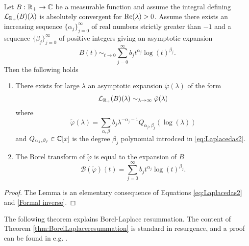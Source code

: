 \begin{lemma}  \label{lem:masterlemma}
Let $B: \mathbb{R}_+ \rightarrow \mathbb{C}$ be a measurable function and assume the integral defining $\mathcal{L}_{\mathbb{R}_+}(B)(\lambda)$ is absolutely convergent for $\operatorname{Re}(\lambda)>0$. Assume there exists an increasing sequence $\{\alpha_j\}_{j=0}^{\infty}$ of real numbers strictly greater than $-1$ and a sequence $\{\beta_j \}_{j=0}^{\infty}$ of positive integers  giving an asymptotic expansion 
\begin{equation} \label{eq:tnearzero} B(t) \sim_{t \rightarrow 0} \sum_{j=0}^{\infty} b_{j} t^{\alpha_j} \log(t)^{\beta_j}.\end{equation}
Then the following holds  \begin{enumerate} \item There exists for large $ \lambda $ an asymptotic expansion $\tilde{\varphi}(\lambda)$ of the form
	\begin{equation}
	\mathcal{L}_{\mathbb{R}_+}(B) (\lambda) \sim_{\lambda \rightarrow \infty} \tilde{\varphi}(\lambda)
	\end{equation} 
	where
	\begin{equation} \label{eq:BorelA}
	\tilde{\varphi}(\lambda)  = \sum_{\alpha, \beta} b_{j} \lambda^{-\alpha_j-1}Q_{\alpha_j,\beta_j}(\log(\lambda))
	\end{equation} 
	and $Q_{\alpha_j,\beta_j} \in \mathbb{C}[x]$ is the degree $\beta_j$ polynomial introdced in \eqref{eq:Laplacedas2}.
	\item The Borel transform of $\tilde{\varphi}$ is equal to the expansion of $B$ 
	\begin{equation} \label{eq:BorelB}
	\mathcal{B}(\tilde{\varphi})(t)=  \sum_{j=0}^{\infty} b_{j} t^{\alpha_j} \log(t)^{\beta_j}.
	\end{equation}  \end{enumerate}
\end{lemma}

\begin{proof} The Lemma is an elementary consequence of Equations \eqref{eq:Laplacedas2} and  \eqref{Formal inverse}.   \end{proof}

The following theorem explains Borel-Laplace resummation. The content of Theorem \ref{thm:BorelLaplaceresummation} is standard in resurgence, and a proof can be found in e.g. \cite{Sauzin07}.

